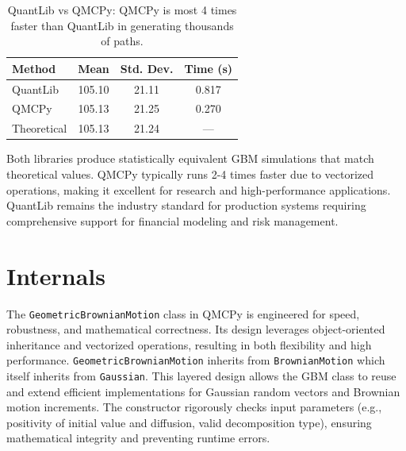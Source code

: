 \documentclass{article}
\begin{document}
\begin{table}[t]
\centering
\caption{QuantLib vs QMCPy: QMCPy is most 4 times faster than QuantLib in generating thousands of paths.}
\begin{tabular}{lccc}
\toprule
\textbf{Method} & \textbf{Mean} & \textbf{Std. Dev.} & \textbf{Time (s)}   \\
\midrule
QuantLib & 105.10 & 21.11 & 0.817  \\
QMCPy & 105.13 & 21.25 & 0.270  \\
Theoretical & 105.13 & 21.24 & ---  \\
\bottomrule
\end{tabular}
\label{tab2}
\end{table}

Both libraries produce statistically equivalent GBM simulations that match theoretical values. QMCPy typically runs 2-4 times faster due to vectorized operations, making it excellent for research and high-performance applications. QuantLib remains the industry standard for production systems requiring comprehensive  support for financial modeling and risk management.


\section{Internals}

The \texttt{GeometricBrownianMotion} class in QMCPy is engineered for speed, robustness, and mathematical correctness. Its design leverages object-oriented inheritance and vectorized operations, resulting in both flexibility and high performance.
\texttt{GeometricBrownianMotion} inherits from \texttt{BrownianMotion} which itself inherits from \texttt{Gaussian}. This layered design allows the GBM class to reuse and extend efficient implementations for Gaussian random vectors and Brownian motion increments.
The constructor rigorously checks input parameters (e.g., positivity of initial value and diffusion, valid decomposition type), ensuring mathematical integrity and preventing runtime errors.
\end{document}

